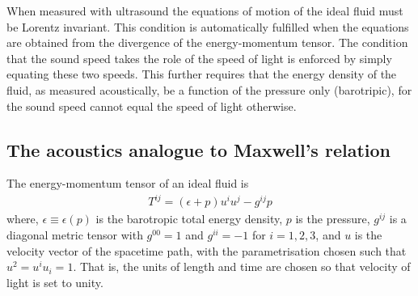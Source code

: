 \documentclass[10pt, fleqn,final,showtrims,oldfontcommands, article,a4paper,oneside]{memoir} %
\newcommand{\eqal}[2]{\begin{align}#1\label{eqn:#2}\end{align}}
\begin{document}
%
When measured with ultrasound the equations of motion of the ideal fluid must be Lorentz invariant.
This condition is  automatically fulfilled  when the equations are obtained from the  divergence of the energy-momentum tensor.
The condition that the sound speed takes the role  of the speed of light
is enforced by simply equating these two speeds.
This further requires that the energy density of the fluid, as measured acoustically, be a function of the pressure only (barotripic),
for the sound speed cannot equal the speed of light otherwise\cite{Taub1978}.

\subsection{The acoustics analogue to Maxwell's relation}\label{sec:MaxwellAnalogue}


The energy-momentum tensor of an ideal fluid is\cite{LandauBook, Taub1978}
\eqal{
  T^{i j} = (\epsilon + p) u^i u^j - g^{i j} p
}{EMtensor}
where, $\epsilon \equiv \epsilon(p)$ is the barotropic total energy density,
$p$ is the pressure,
$g^{i j}$ is a diagonal metric tensor with $g^{00}=1$ and $g^{i i} = -1$ for $i=1,2,3$,
and 
$u$ is the velocity vector of the spacetime path, with the parametrisation chosen such that $u^2 = u^i u_i = 1$. %
That is, the units of length and time are chosen so that velocity of light is set to unity.
\end{document}
